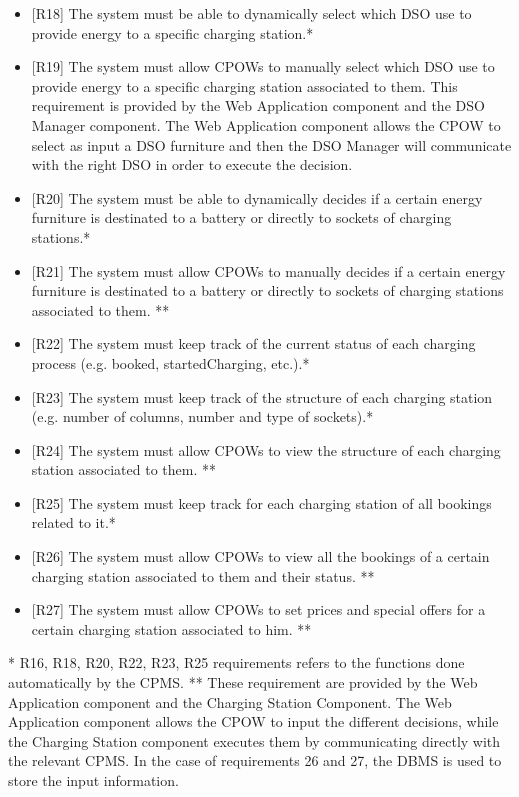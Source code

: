 \documentclass[a4paper]{report}
\begin{document}
\begin{itemize}
    \item{[R18]} \label{R18} The system must be able to dynamically select which DSO use to provide energy to a specific charging station.*
    \item{[R19]} \label{R19} The system must allow CPOWs to manually select which DSO use to provide energy to a specific charging station associated to them. This requirement is provided by the Web Application component and the DSO Manager component. The Web Application component allows the CPOW to select as input a DSO furniture and then the DSO Manager will communicate with the right DSO in order to execute the decision.
    \item{[R20]} \label{R20} The system must be able to dynamically decides if a certain energy furniture is destinated to a battery or directly to sockets of charging stations.*
    \item{[R21]} \label{R21} The system must allow CPOWs to manually decides if a certain energy furniture is destinated to a battery or directly to sockets of charging stations associated to them. **
    \item{[R22]} \label{R22} The system must keep track of the current status of each charging process (e.g. booked, startedCharging, etc.).*
    \item{[R23]} \label{R23} The system must keep track of the structure of each charging station (e.g. number of columns, number and type of sockets).*
    \item{[R24]} \label{R24} The system must allow CPOWs to view the structure of each charging station associated to them. **
    \item{[R25]} \label{R25} The system must keep track for each charging station of all bookings related to it.*
    \item{[R26]} \label{R26} The system must allow CPOWs to view all the bookings of a certain charging station associated to them and their status. **
    \item{[R27]} \label{R27} The system must allow CPOWs to set prices and special offers for a certain charging station associated to him. **
\end{itemize}
* R16, R18, R20, R22, R23, R25 requirements refers to the functions done automatically by the CPMS.\newline
** These requirement are provided by the Web Application component and the Charging Station Component. The Web Application component allows the CPOW to input the different decisions, while the Charging Station component executes them by communicating directly with the relevant CPMS. In the case of requirements 26 and 27, the DBMS is used to store the input information.
\end{document}
